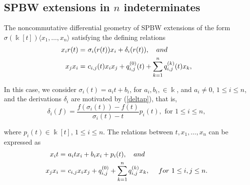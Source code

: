\documentclass{amsart}
\theoremstyle{definition}
\theoremstyle{remark}
\numberwithin{equation}{section}
\begin{document}
\subsection{SPBW extensions in \texorpdfstring{$n$}{Lg} indeterminates}\label{SPBWTMGeneralCase}

The noncommutative differential geometry of SPBW extensions of the form $\sigma(\Bbbk[t]) \langle x_1, \ldots, x_n\rangle$ satisfying the defining relations
\begin{align*}
    x_ir(t) = &\ \sigma_i(r(t)) x_i + \delta_i(r(t)), \quad {\rm and} \\
    x_j x_i = &\ c_{i, j}(t)x_i x_j + q_{i,j}^{(0)}(t) + \sum_{k=1}^{n}q_{i,j}^{(k)}(t)x_k, 
\end{align*}

In this case, we consider $\sigma_i(t)=a_it+b_i$, for $a_i, b_i, \in \Bbbk$,  and $a_i\not=0$, $1\leq i \leq n$,  and the derivations $\delta_i$ are motivated by (\ref{deltap}), that is,
\begin{equation}
    \delta_i(f)=\frac{f\left(\sigma_{i}(t)\right)-f(t)}{\sigma_{i}(t)-t}p_i(t), \text{ for } 1 \leq i \leq n, 
\end{equation}

where $p_i(t) \in\Bbbk[t]$, $1 \leq i \leq n$. The relations between $t, x_1, \ldots, x_n$ can be expressed as
\begin{align}
    x_it = &\ a_itx_i+b_ix_i+p_i(t), \quad {\rm and} \label{twithxi} \\
    x_j x_i = &\ c_{i, j}x_i x_j + q_{i,j}^{(0)} + \sum_{k=1}^{n}q_{i,j}^{(k)}x_k, \quad\ {\rm for}\ 1 \leq i,j \leq n. \label{xiandxj} 
\end{align}
\end{document}
